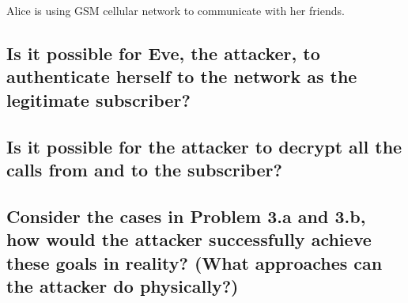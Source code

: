 \documentclass[a4paper]{report}
\begin{document}
Alice is using GSM cellular network to communicate with her friends.

\subsection{Is it possible for Eve, the attacker, to authenticate herself to the network as the
      legitimate subscriber?}

\subsection{Is it possible for the attacker to decrypt all the calls from and to the subscriber?}

\subsection{Consider the cases in Problem 3.a and 3.b, how would the attacker successfully
      achieve these goals in \textbf{reality}? (What approaches can the attacker do physically?)}
\end{document}
